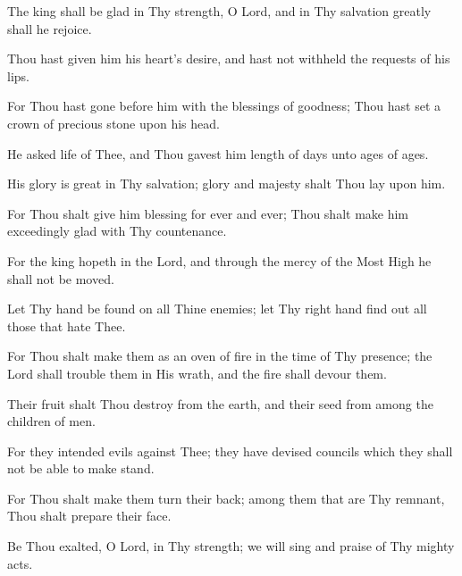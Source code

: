 The king shall be glad in Thy strength, O Lord, and in Thy salvation greatly shall he rejoice.

Thou hast given him his heart's desire, and hast not withheld the requests of his lips.

For Thou hast gone before him with the blessings of goodness; Thou hast set a crown of precious stone upon his head.

He asked life of Thee, and Thou gavest him length of days unto ages of ages.

His glory is great in Thy salvation; glory and majesty shalt Thou lay upon him.

For Thou shalt give him blessing for ever and ever; Thou shalt make him exceedingly glad with Thy countenance.

For the king hopeth in the Lord, and through the mercy of the Most High he shall not be moved.

Let Thy hand be found on all Thine enemies; let Thy right hand find out all those that hate Thee.

For Thou shalt make them as an oven of fire in the time of Thy presence; the Lord shall trouble them in His wrath, and the fire shall devour them.

Their fruit shalt Thou destroy from the earth, and their seed from among the children of men.

For they intended evils against Thee; they have devised councils which they shall not be able to make stand.

For Thou shalt make them turn their back; among them that are Thy remnant, Thou shalt prepare their face.

Be Thou exalted, O Lord, in Thy strength; we will sing and praise of Thy mighty acts.
